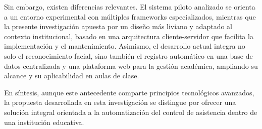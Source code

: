 Sin embargo, existen diferencias relevantes. El sistema piloto analizado se orienta a un entorno experimental con múltiples frameworks especializados, mientras que la presente investigación apuesta por un diseño más liviano y adaptado al contexto institucional, basado en una arquitectura cliente-servidor que facilita la implementación y el mantenimiento. Asimismo, el desarrollo actual integra no solo el reconocimiento facial, sino también el registro automático en una base de datos centralizada y una plataforma web para la gestión académica, ampliando su alcance y su aplicabilidad en aulas de clase.

En síntesis, aunque este antecedente comparte principios tecnológicos avanzados, la propuesta desarrollada en esta investigación se distingue por ofrecer una solución integral orientada a la automatización del control de asistencia dentro de una institución educativa.